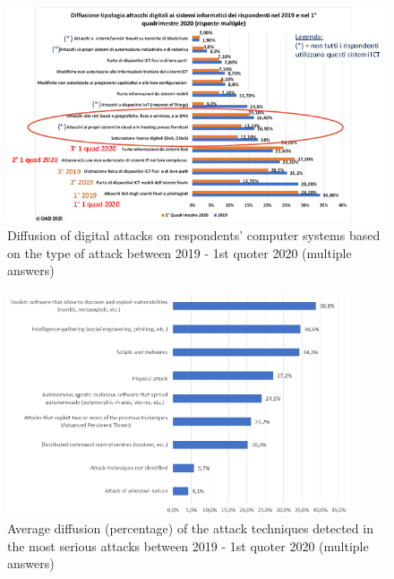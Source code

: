 \documentclass{easychair}
\begin{document}
\begin{figure}
	\centering
		\includegraphics[width=1\textwidth]{pictures/fig5.png}
		\caption{Diffusion of digital attacks on respondents' computer systems based on the type of attack between 2019 - 1st quoter 2020 (multiple answers) \cite{oad20}}
		\label{fig:5}
\end{figure}
\begin{figure}
	\centering
		\includegraphics[width=0.90\textwidth]{pictures/fig6.png}
		\caption{Average diffusion (percentage) of the attack techniques detected in the most serious attacks between 2019 - 1st quoter 2020 (multiple answers) \cite{oad20}}
		\label{fig:6}
\end{figure}
\end{document}
